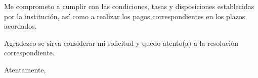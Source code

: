 \documentclass[a4paper,12pt]{article}
\begin{document}
\noindent Me comprometo a cumplir con las condiciones, tasas y disposiciones establecidas por la institución, así como a realizar los pagos correspondientes en los plazos acordados.

\vspace{0.5cm}

\noindent Agradezco se sirva considerar mi solicitud y quedo atento(a) a la resolución correspondiente.

\noindent Atentamente,

\vspace{2.5cm}


\noindent{}  

\noindent{}      

\noindent{}  

\noindent{} 
\end{document}
